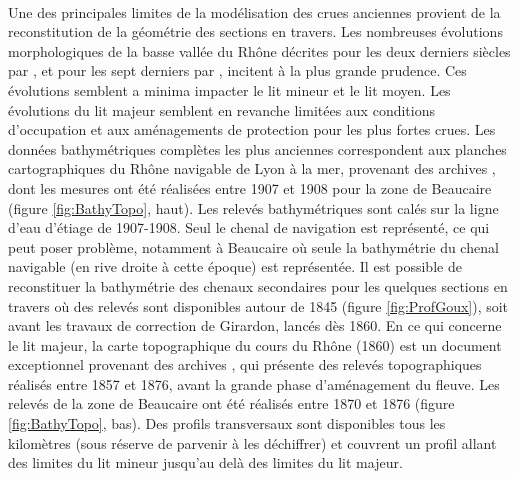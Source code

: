 	\paragraph{} Une des principales limites de la modélisation des crues anciennes provient de la reconstitution de la géométrie des sections en travers. Les nombreuses évolutions morphologiques de la basse vallée du Rhône décrites pour les deux derniers siècles par \citet{raccasi_mutations_2008}, et pour les sept derniers	par \citet{pichard_sept_2014}, incitent à la plus grande prudence. Ces évolutions semblent a minima impacter le lit mineur et le lit moyen. Les évolutions du lit majeur semblent en revanche limitées aux conditions d'occupation et aux aménagements de protection pour les plus fortes crues. Les données bathymétriques complètes les plus anciennes correspondent aux planches cartographiques du Rhône navigable de Lyon à la mer, provenant des archives \citet{cnr_cartes_1908}, dont les mesures ont été réalisées entre 1907 et 1908 pour la zone de Beaucaire (figure \ref{fig:BathyTopo}, haut). Les relevés bathymétriques sont calés sur la ligne d'eau d'étiage de 1907-1908. Seul le chenal de navigation est représenté, ce qui peut poser problème, notamment à Beaucaire où seule la bathymétrie du chenal navigable (en rive droite à cette époque) est représentée. Il est possible de reconstituer la bathymétrie des chenaux secondaires pour les quelques sections en travers où des relevés sont disponibles autour de 1845 (figure \ref{fig:ProfGoux}), soit avant les travaux de correction de Girardon, lancés dès 1860. En ce qui concerne le lit majeur, la carte topographique du cours du Rhône (1860) est un document exceptionnel provenant des archives \citet{cnr_carte_1876}, qui présente des relevés topographiques réalisés entre 1857 et 1876, avant la grande phase d'aménagement du fleuve. Les relevés de la zone de Beaucaire ont été réalisés entre 1870 et 1876 (figure \ref{fig:BathyTopo}, bas). Des profils transversaux sont disponibles tous les kilomètres (sous réserve de parvenir à les déchiffrer) et couvrent un profil allant des limites du lit mineur jusqu'au delà des limites du lit majeur.
		
